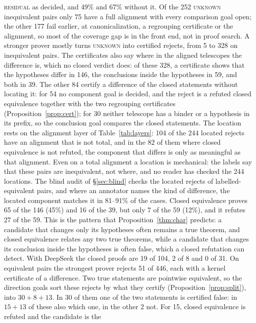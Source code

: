 \documentclass[10pt]{article}
\theoremstyle{definition}
\newcommand{\V}[1]{\textsc{#1}}
\begin{document}
\V{residual} as decided, and 49\% and 67\% without it. Of the 252 \V{unknown} inequivalent pairs only 75 have a full alignment with every
comparison goal open; the other 177 fail earlier, at canonicalization, a regrouping certificate
or the alignment, so most of the coverage gap is in the front end, not in proof search. A stronger prover mostly turns \V{unknown} into certified rejects, from 5 to 328 on
inequivalent pairs. The certificates also say where in the aligned telescopes the difference
is, which no closed verdict does: of these 328, a certificate shows that the hypotheses differ in 146, the conclusions
inside the hypotheses in 59, and both in 39. The other 84 certify a difference of the closed
statements without locating it: for 54 no component goal is decided, and the reject is a refuted
closed equivalence together with the two regrouping certificates (Proposition~\ref{prop:cert});
for 30 neither telescope has a binder or a hypothesis in its prefix, so the conclusion goal
compares the closed statements. The location rests on the alignment layer of
Table~\ref{tab:layers}: 104 of the 244 located rejects have an alignment that is not total, and
in the 82 of them where closed equivalence is not refuted, the component that differs is only
as meaningful as that alignment. Even on a total alignment a location is mechanical: the labels
say that these pairs are inequivalent, not where, and no reader has checked the 244 locations.
The blind audit of \S\ref{sec:blind} checks the located rejects of labelled-equivalent pairs, and
where an annotator names the kind of difference, the located component matches it in 81--91\% of
the cases. Closed equivalence proves 65 of the 146 (45\%) and 16 of the
39, but only 7 of the 59 (12\%), and it refutes 27 of the 59. This is the pattern that Proposition~\ref{thm:char}
predicts: a candidate that changes only its hypotheses often remains a true theorem, and closed
equivalence relates any two true theorems, while a candidate that changes its conclusion inside
the hypotheses is often false, which a closed refutation can detect. With DeepSeek the closed
proofs are 19 of 104, 2 of 8 and 0 of 31. On equivalent pairs the strongest prover rejects 51 of 446, each with a kernel
certificate of a difference. Two true statements are pointwise equivalent, so the direction goals
sort these rejects by what they certify (Proposition~\ref{prop:split}), into $30+8+13$. In 30
of them one of the two statements is certified false: in $15+13$ of these also which one, in
the other 2 not. For 15, closed equivalence is refuted and the candidate is the
\end{document}
